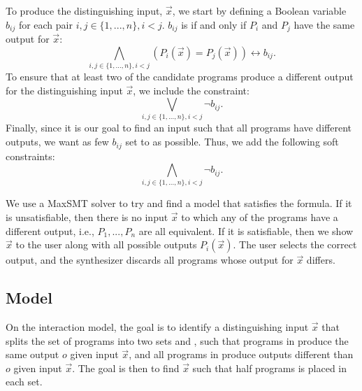 To produce the distinguishing input, \(\vec{x}\), we start by defining a Boolean variable \(b_{ij}\) for each pair \(i,j\in\{1, ..., n\},i<j\). \(b_{ij}\) is \true if and only if \(P_i\) and \(P_j\) have the same output for \(\vec{x}\):
%
\begin{equation}
    \bigwedge_{i,j \in \{1, ..., n\}, i < j} (P_i(\vec{x}) = P_j(\vec{x})) \leftrightarrow b_{ij}.
\end{equation}
%
To ensure that at least two of the candidate programs produce a different output for the distinguishing input \(\vec{x}\), we include the constraint:
%
\begin{equation}
    \bigvee_{i,j \in \{1, ..., n\}, i < j} \neg b_{ij}.
\end{equation}
%
Finally, since it is our goal to find an input such that all programs have different outputs, we want as few \(b_{ij}\) set to \true as possible.
Thus, we add the following soft constraints:
%
\begin{equation}
    \bigwedge_{i,j \in \{1, ..., n\}, i < j} \neg b_{ij}.
\end{equation}

We use a \ac{MaxSMT} solver to try and find a model that satisfies the formula. If it is unsatisfiable, then there is no input \(\vec{x}\) to which any of the programs have a different output, i.e., \(P_1, ..., P_n\) are all equivalent. If it is satisfiable, then we show \(\vec{x}\) to the user along with all possible outputs \(P_i(\vec{x})\). The user selects the correct output, and the synthesizer discards all programs whose output for \(\vec{x}\) differs.

\subsection{\ynmodel Model}

On the \ynmodel interaction model, the goal is to identify a distinguishing input \(\vec{x}\) that splits the set of programs into two sets  and , such that programs in  produce the same output \(o\)  given input \(\vec{x}\), and all programs in  produce outputs different than \(o\) given input \(\vec{x}\).
%
The goal is then to find \(\vec{x}\) such that half programs is placed in each set.

